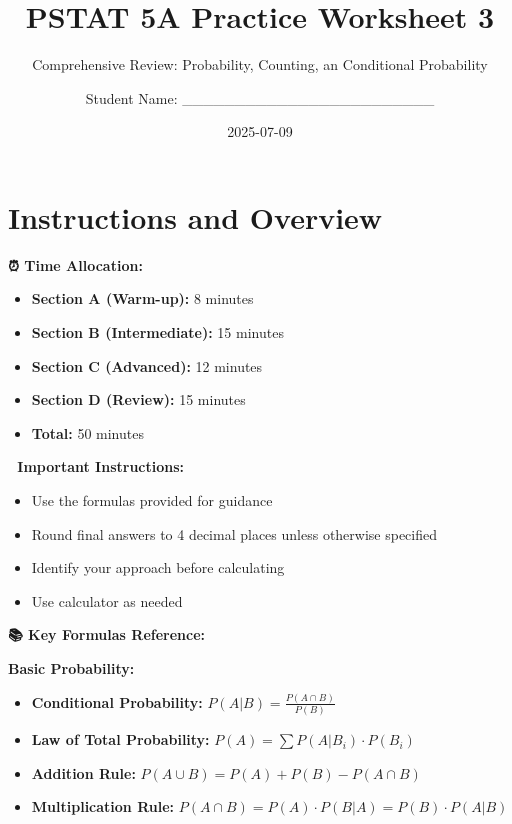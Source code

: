 \documentclass[
  11pt,
]{article}
\title{PSTAT 5A Practice Worksheet 3}
\subtitle{Comprehensive Review: Probability, Counting, an Conditional
Probability}
\author{Student Name: \_\_\_\_\_\_\_\_\_\_\_\_\_\_\_\_\_\_\_\_\_\_\_\_}
\date{2025-07-09}
\renewcommand*\contentsname{Table of contents}
\newcommand\contentsname{Table of contents}
\begin{document}
\maketitle

\renewcommand*\contentsname{Table of contents}
{
\hypersetup{linkcolor=}
\setcounter{tocdepth}{3}
\tableofcontents
}

\section{Instructions and Overview}\label{instructions-and-overview}

\textbf{⏰ Time Allocation:}

\begin{itemize}
\item
  \textbf{Section A (Warm-up):} 8 minutes
\item
  \textbf{Section B (Intermediate):} 15 minutes
\item
  \textbf{Section C (Advanced):} 12 minutes
\item
  \textbf{Section D (Review):} 15 minutes
\item
  \textbf{Total:} 50 minutes
\end{itemize}

\textbf{📝 Important Instructions:}

\begin{itemize}
\item
  Use the formulas provided for guidance
\item
  Round final answers to 4 decimal places unless otherwise specified
\item
  Identify your approach before calculating
\item
  Use calculator as needed
\end{itemize}

\textbf{📚 Key Formulas Reference:}

\textbf{Basic Probability:}

\begin{itemize}
\item
  \textbf{Conditional Probability:}
  \(P(A|B) = \frac{P(A \cap B)}{P(B)}\)
\item
  \textbf{Law of Total Probability:}
  \(P(A) = \sum P(A|B_i) \cdot P(B_i)\)
\item
  \textbf{Addition Rule:} \(P(A \cup B) = P(A) + P(B) - P(A \cap B)\)
\item
  \textbf{Multiplication Rule:}
  \(P(A \cap B) = P(A) \cdot P(B|A) = P(B) \cdot P(A|B)\)
\end{itemize}
\end{document}
